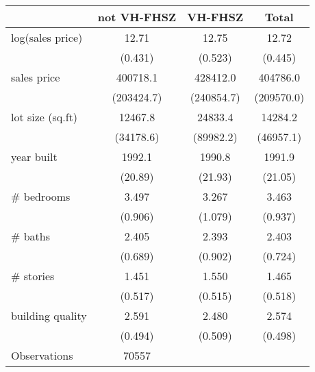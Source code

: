 \begin{tabular}{l*{3}{c}}
\hline\hline
                    & not VH-FHSZ&     VH-FHSZ&       Total\\
\hline
log(sales price)    &       12.71&       12.75&       12.72\\
                    &     (0.431)&     (0.523)&     (0.445)\\
[1em]
sales price         &    400718.1&    428412.0&    404786.0\\
                    &  (203424.7)&  (240854.7)&  (209570.0)\\
[1em]
lot size (sq.ft)    &     12467.8&     24833.4&     14284.2\\
                    &   (34178.6)&   (89982.2)&   (46957.1)\\
[1em]
year built          &      1992.1&      1990.8&      1991.9\\
                    &     (20.89)&     (21.93)&     (21.05)\\
[1em]
\# bedrooms         &       3.497&       3.267&       3.463\\
                    &     (0.906)&     (1.079)&     (0.937)\\
[1em]
\# baths            &       2.405&       2.393&       2.403\\
                    &     (0.689)&     (0.902)&     (0.724)\\
[1em]
\# stories          &       1.451&       1.550&       1.465\\
                    &     (0.517)&     (0.515)&     (0.518)\\
[1em]
building quality    &       2.591&       2.480&       2.574\\
                    &     (0.494)&     (0.509)&     (0.498)\\
\hline
Observations        &       70557&            &            \\
\hline\hline
\end{tabular}
